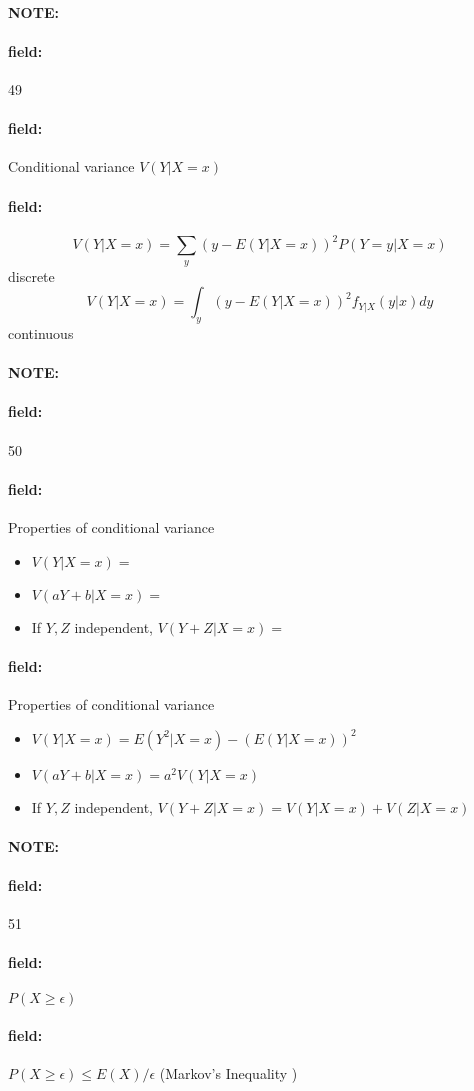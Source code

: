 \documentclass[12pt]{article}
\newenvironment{note}{\paragraph{NOTE:}}{}
\newenvironment{field}{\paragraph{field:}}{}
\begin{document}
\begin{note}
  \begin{field}
  \tiny 49
\end{field}
  \begin{field}
    Conditional variance $V(Y|X = x)$
  \end{field}
  \begin{field}
    $$V(Y|X = x) = \sum_y (y - E(Y|X=x))^2P(Y=y|X=x)$$ discrete
    $$V(Y|X = x) = \int_y (y - E(Y|X=x))^2 f_{Y|X}(y|x)dy$$ continuous
  \end{field}
\end{note}

\begin{note}
  \begin{field}
    \tiny 50
  \end{field}
  \begin{field}
    Properties of conditional variance
    \begin{itemize}
      \item $V(Y|X=x) = $
      \item $V(aY + b | X = x) = $
      \item If $Y,Z$ independent, $V(Y+Z | X=x) = $
    \end{itemize}
  \end{field}
  \begin{field}
    Properties of conditional variance
    \begin{itemize}
      \item $V(Y|X=x) = E(Y^2 | X=x) - (E(Y|X=x))^2$
      \item $V(aY + b | X = x) = a^2 V(Y|X=x)$
      \item If $Y,Z$ independent, $V(Y+Z | X=x) = V(Y|X=x) + V(Z|X=x)$
    \end{itemize}
  \end{field}
\end{note}


\begin{note}
  \begin{field}
    \tiny 51
  \end{field}
  \begin{field}
    $P(X \geq \epsilon)$
  \end{field}
  \begin{field}
    $P(X \geq \epsilon) \leq E(X) / \epsilon$ (Markov's Inequality )
  \end{field}
\end{note}
\end{document}
